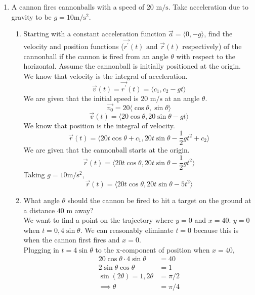\begin{enumerate}
	\item A cannon fires cannonballs with a speed of $20 \text{ m} / \text{s}$. Take acceleration due to gravity to be $g = 10 \text{m} / \text{s}^2$.
	\begin{enumerate}[label=\alph*.]
		\item Starting with a constant acceleration function $\vec{a} = \langle 0, -g \rangle$, find the velocity and position functions ($\vec{r^\prime}(t) \text{ and } \vec{r}(t)$ respectively) of the cannonball if the cannon is fired from an angle $\theta$ with respect to the horizontal. Assume the cannonball is initially positioned at the origin.\\
		We know that velocity is the integral of acceleration.
		\begin{equation*}
			\vec{v}(t) = \vec{r^\prime}(t) = \langle c_1, c_2-gt \rangle	
		\end{equation*}
		We are given that the initial speed is $20 \text{ m} / \text{s}$ at an angle $\theta$.
		\begin{equation*}
			\vec{v_0} = 20\langle \cos{\theta}, \sin{\theta} \rangle	
		\end{equation*}
		\begin{equation*}
			\vec{v}(t) = \langle 20\cos{\theta}, 20\sin{\theta}-gt \rangle	
		\end{equation*}
		We know that position is the integral of velocity.
		\begin{equation*}
			\vec{r}(t) = \langle 20t\cos{\theta} + c_1, 20t\sin{\theta} - \frac{1}{2}gt^2 + c_2 \rangle
		\end{equation*}
		We are given that the cannonball starts at the origin.
		\begin{equation*}
			\vec{r}(t) = \langle 20t\cos{\theta}, 20t\sin{\theta} - \frac{1}{2}gt^2 \rangle	
		\end{equation*}
		Taking $g = 10 \text{m} / \text{s}^2$,\\
		\begin{equation*}
			\vec{r}(t) = \langle 20t\cos{\theta}, 20t\sin{\theta}-5t^2 \rangle	
		\end{equation*}
			
		\item What angle $\theta$ should the cannon be fired to hit a target on the ground at a distance $40\text{ m}$ away?\\
		We want to find a point on the trajectory where $y = 0$ and $x = 40$.
		$y = 0$ when $t = 0, 4\sin{\theta}$. We can reasonably eliminate $t = 0$ because this is when the cannon first fires and $x = 0$.\\
		Plugging in $t = 4\sin{\theta}$ to the x-component of position when $x = 40$,
		\begin{align*}
			20\cos{\theta} \cdot 4\sin{\theta} &= 40 \\
			2\sin{\theta}\cos{\theta} &= 1 \\
			\sin{(2\theta)}=1, 2\theta &= \pi/2 \\
			\implies \theta &= \pi/4			
		\end{align*}
	\end{enumerate}
	

\end{enumerate}
